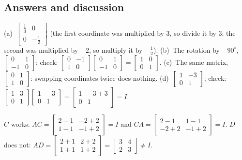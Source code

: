 \documentclass[11pt]{article}
\begin{document}
\subsection*{Answers and discussion}
\begin{description}[leftmargin=0pt,itemsep=5pt]
  \item[Knowledge Check \ref{kc:guess}.] (a)~$\begin{bmatrix}\tfrac13&0\\0&-\tfrac12\end{bmatrix}$ (the first coordinate was multiplied by $3$, so divide it by $3$; the second was multiplied by $-2$, so multiply it by $-\tfrac12$). (b)~The rotation by $-90^\circ$, $\begin{bmatrix}0&1\\-1&0\end{bmatrix}$; check: $\begin{bmatrix}0&-1\\1&0\end{bmatrix}\begin{bmatrix}0&1\\-1&0\end{bmatrix}=\begin{bmatrix}1&0\\0&1\end{bmatrix}$. (c)~The same matrix, $\begin{bmatrix}0&1\\1&0\end{bmatrix}$: swapping coordinates twice does nothing. (d)~$\begin{bmatrix}1&-3\\0&1\end{bmatrix}$; check: $\begin{bmatrix}1&3\\0&1\end{bmatrix}\begin{bmatrix}1&-3\\0&1\end{bmatrix}=\begin{bmatrix}1&-3+3\\0&1\end{bmatrix}=I$.
  \item[Knowledge Check \ref{kc:verify}.] $C$ works: $AC=\begin{bmatrix}2-1&-2+2\\1-1&-1+2\end{bmatrix}=I$ and $CA=\begin{bmatrix}2-1&1-1\\-2+2&-1+2\end{bmatrix}=I$. $D$ does not: $AD=\begin{bmatrix}2+1&2+2\\1+1&1+2\end{bmatrix}=\begin{bmatrix}3&4\\2&3\end{bmatrix}\neq I$.

\end{description}
\end{document}
